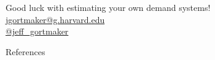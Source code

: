 \documentclass[aspectratio=169,t,11pt,table]{beamer}
\begin{document}
\begin{frame}[c]{}
    \begin{center}
        Good luck with estimating your own demand systems! \\[\baselineskip]
        \href{mailto:jgortmaker@g.harvard.edu}{jgortmaker@g.harvard.edu} \\
        \href{https://twitter.com/jeff_gortmaker}{@jeff\_gortmaker}
    \end{center}
\end{frame}

\backupbegin

\begin{frame}{References}
    
\end{frame}

\backupend
\end{document}

